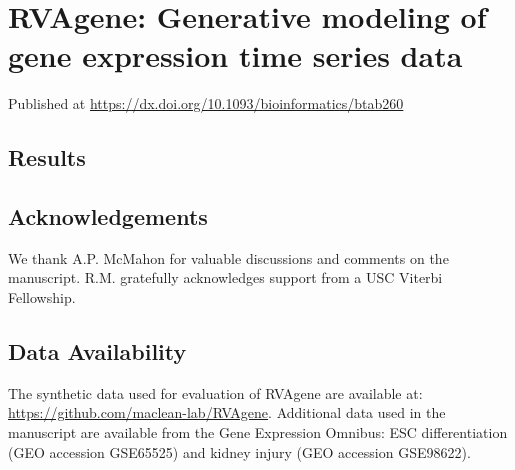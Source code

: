 \documentclass[letterpaper,11pt]{report}
\begin{document}
\chapter{RVAgene: Generative modeling of gene expression time series data}
\label{cha:research_topic_1}


\vspace*{0.35in}

\begin{flushleft}

    Published at \href{https://dx.doi.org/10.1093/bioinformatics/btab260}{https://dx.doi.org/10.1093/bioinformatics/btab260}

\end{flushleft}






\section{Results}








\section*{Acknowledgements}
We thank A.P. McMahon for valuable discussions and comments on the manuscript.
R.M. gratefully acknowledges support from a USC Viterbi Fellowship.

\section*{Data Availability}
The synthetic data used for evaluation of RVAgene are available at:
\url{https://github.com/maclean-lab/RVAgene}. Additional data used in the manuscript are available from the Gene Expression Omnibus: ESC differentiation (GEO accession GSE65525) and kidney injury (GEO accession GSE98622).
\end{document}
